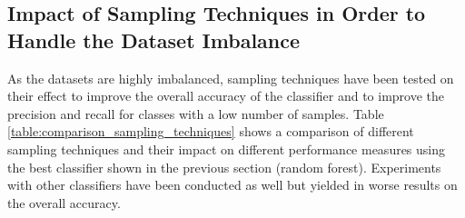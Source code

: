 \subsection{Impact of Sampling Techniques in Order to Handle the Dataset Imbalance}

As the datasets are highly imbalanced, sampling techniques have been tested on their effect to improve the overall accuracy of the classifier and to improve the precision and recall for classes with a low number of samples. Table \ref{table:comparison_sampling_techniques} shows a comparison of different sampling techniques and their impact on different performance measures using the best classifier shown in the previous section (random forest). Experiments with other classifiers have been conducted as well but yielded in worse results on the overall accuracy.

\begin{table}


\caption{Comparison of different sampling techniques and their effect on the performance of a random forest classifier on the filtered dataset.}
\label{table:comparison_sampling_techniques}
\end{table}


